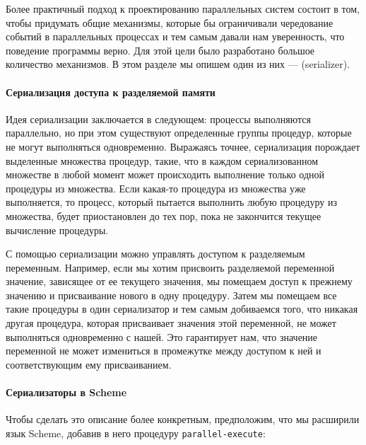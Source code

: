 Более практичный подход к проектированию параллельных
систем состоит в том, чтобы придумать общие механизмы, которые бы
ограничивали чередование событий в параллельных процессах и тем самым
давали нам уверенность, что поведение программы верно.  Для этой цели
было разработано большое количество механизмов.  В этом разделе мы
опишем один из них ---  (serializer).

\paragraph{Сериализация доступа к разделяемой памяти}


Идея сериализации заключается в следующем: процессы
выполняются параллельно, но при этом существуют определенные группы
процедур, которые не могут выполняться одновременно.  Выражаясь
точнее, сериализация порождает выделенные множества процедур, такие,
что в каждом сериализованном множестве в любой момент может
происходить выполнение только одной процедуры из множества.  Если
какая-то процедура из множества уже выполняется, то процесс, который
пытается выполнить любую процедуру из множества, будет приостановлен до
тех пор, пока не закончится текущее вычисление процедуры.

С помощью сериализации можно управлять доступом к
разделяемым переменным.  Например, если мы хотим присвоить разделяемой
переменной значение, зависящее от ее текущего значения, мы помещаем
доступ к прежнему значению и присваивание нового в одну процедуру.
Затем мы помещаем все такие процедуры в один сериализатор и тем самым
добиваемся того, что никакая другая процедура, которая
присваивает значения этой переменной, не может выполняться
одновременно с нашей.  Это гарантирует нам, что значение переменной не
может измениться в промежутке между доступом к ней и соответствующим
ему присваиванием.

\paragraph{Сериализаторы в Scheme}


Чтобы сделать это описание более конкретным, предположим,
что мы расширили язык Scheme, добавив в него процедуру
{\tt parallel-execute}:

